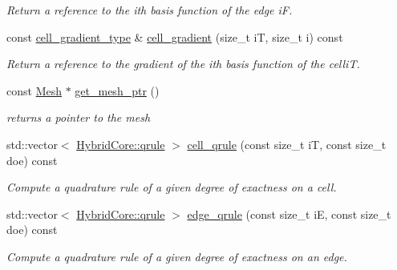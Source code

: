 \begin{DoxyCompactItemize}
\begin{DoxyCompactList}\small\item\em Return a reference to the i\textquotesingle{}th basis function of the edge iF. \end{DoxyCompactList}\item 
const \hyperlink{classHArDCore2D_1_1HybridCore_a41350d7c3ac5a5a5e932348d2c9d0750}{cell\+\_\+gradient\+\_\+type} \& \hyperlink{classHArDCore2D_1_1HybridCore_a710fc23b914623b90a2699ab4291e539}{cell\+\_\+gradient} (size\+\_\+t iT, size\+\_\+t i) const
\begin{DoxyCompactList}\small\item\em Return a reference to the gradient of the i\textquotesingle{}th basis function of the celliT. \end{DoxyCompactList}\item 
\mbox{\label{classHArDCore2D_1_1HybridCore_aee6b463bf137045e5581f9aab80e9a19}} 
const \hyperlink{classHArDCore2D_1_1Mesh}{Mesh} $\ast$ \hyperlink{classHArDCore2D_1_1HybridCore_aee6b463bf137045e5581f9aab80e9a19}{get\+\_\+mesh\+\_\+ptr} ()
\begin{DoxyCompactList}\small\item\em returns a pointer to the mesh \end{DoxyCompactList}\item 
std\+::vector$<$ \hyperlink{structHArDCore2D_1_1HybridCore_1_1qrule}{Hybrid\+Core\+::qrule} $>$ \hyperlink{classHArDCore2D_1_1HybridCore_a9ecd6ca61d4f9e3f3e3af81d8de394d0}{cell\+\_\+qrule} (const size\+\_\+t iT, const size\+\_\+t doe) const
\begin{DoxyCompactList}\small\item\em Compute a quadrature rule of a given degree of exactness on a cell. \end{DoxyCompactList}\item 
std\+::vector$<$ \hyperlink{structHArDCore2D_1_1HybridCore_1_1qrule}{Hybrid\+Core\+::qrule} $>$ \hyperlink{classHArDCore2D_1_1HybridCore_a448297d0d0afefe477815dfb7821b270}{edge\+\_\+qrule} (const size\+\_\+t iE, const size\+\_\+t doe) const
\begin{DoxyCompactList}\small\item\em Compute a quadrature rule of a given degree of exactness on an edge. \end{DoxyCompactList}\item 
\mbox{\label{classHArDCore2D_1_1HybridCore_a02b46a742045262030431b73eb112f9c}} 

\end{DoxyCompactItemize}
